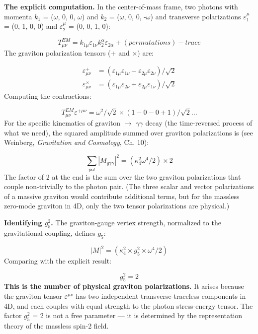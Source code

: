 \documentclass[aps,prd,preprint,superscriptaddress,longbibliography,floatfix]{revtex4-2}
\theoremstyle{remark}
\begin{document}
\textbf{The explicit computation.} In the center-of-mass frame, two photons with momenta $k_{1}$ = ($\omega$, 0, 0, $\omega$) and $k_{2}$ = ($\omega$, 0, 0, -$\omega$) and transverse polarizations $\varepsilon_{1}^\mu$ = (0, 1, 0, 0) and $\varepsilon_{2}^\mu$ = (0, 0, 1, 0):


\begin{equation}
    T^{EM}_{\mu\nu} = k_{1\mu} \varepsilon_{1\nu} k_2^\alpha \varepsilon_{2\alpha} + (permutations) - trace
\end{equation}
The graviton polarization tensors ($+$ and $\times$) are:


\begin{align}
    \varepsilon^+_{\mu\nu} &= (\varepsilon_{1\mu} \varepsilon_{1\nu} - \varepsilon_{2\mu} \varepsilon_{2\nu})/\sqrt{2} \\
    \varepsilon^\times_{\mu\nu} &= (\varepsilon_{1\mu} \varepsilon_{2\nu} + \varepsilon_{2\mu} \varepsilon_{1\nu})/\sqrt{2}
\end{align}
Computing the contractions:


\begin{equation}
    T^{EM}_{\mu\nu} \varepsilon^{+\mu\nu} = \omega^{2}/\sqrt{2} \times (1 - 0 - 0 + 1)/\sqrt{2} ...
\end{equation}
For the specific kinematics of graviton $\to$ $\gamma\gamma$ decay (the time-reversed process of what we need), the squared amplitude summed over graviton polarizations is (see Weinberg, \textit{Gravitation and Cosmology}, Ch. 10):


\begin{equation}
    \sum_{pol} |M_{g\gamma\gamma}|^{2} = (\kappa_{4}^{2} \omega^{4}/2) \times 2
\end{equation}
The factor of 2 at the end is the sum over the two graviton polarizations that couple non-trivially to the photon pair. (The three scalar and vector polarizations of a massive graviton would contribute additional terms, but for the massless zero-mode graviton in 4D, only the two tensor polarizations are physical.)

\textbf{Identifying $g_{5}^{2}$.} The graviton-gauge vertex strength, normalized to the gravitational coupling, defines $g_{5}$:


\begin{equation}
    |M|^{2} = (\kappa_{4}^{2} \times g_{5}^{2} \times \omega^{4}/2)
\end{equation}
Comparing with the explicit result:


\begin{equation}
    g_{5}^{2} = 2
\end{equation}
\textbf{This is the number of physical graviton polarizations.} It arises because the graviton tensor $\varepsilon^{\mu\nu}$ has two independent transverse-traceless components in 4D, and each couples with equal strength to the photon stress-energy tensor. The factor $g_{5}^{2}$ = 2 is not a free parameter --- it is determined by the representation theory of the massless spin-2 field.
\end{document}
